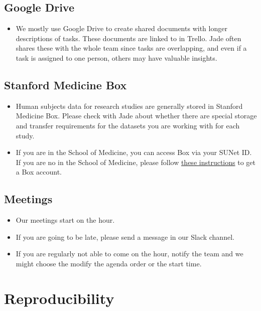 \documentclass[
]{book}
\providecommand{\tightlist}{%
  \setlength{\itemsep}{0pt}\setlength{\parskip}{0pt}}
\begin{document}
\section{Google Drive}\label{google-drive}

\begin{itemize}
\tightlist
\item
  We mostly use Google Drive to create shared documents with longer descriptions of tasks. These documents are linked to in Trello. Jade often shares these with the whole team since tasks are overlapping, and even if a task is assigned to one person, others may have valuable insights.
\end{itemize}

\section{Stanford Medicine Box}\label{stanford-medicine-box}

\begin{itemize}
\tightlist
\item
  Human subjects data for research studies are generally stored in Stanford Medicine Box. Please check with Jade about whether there are special storage and transfer requirements for the datasets you are working with for each study.
\item
  If you are in the School of Medicine, you can access Box via your SUNet ID. If you are no in the School of Medicine, please follow \href{https://docs.google.com/document/d/1R3Ngpi8LsezHU0KhgllSKh_XJtQafczrZe3pmeWH2jY/edit?usp=sharing}{these instructions} to get a Box account.
\end{itemize}

\section{Meetings}\label{meetings}

\begin{itemize}
\tightlist
\item
  Our meetings start on the hour.
\item
  If you are going to be late, please send a message in our Slack channel.
\item
  If you are regularly not able to come on the hour, notify the team and we might choose the modify the agenda order or the start time.
\end{itemize}

\chapter{Reproducibility}\label{reproducibility}
\end{document}
